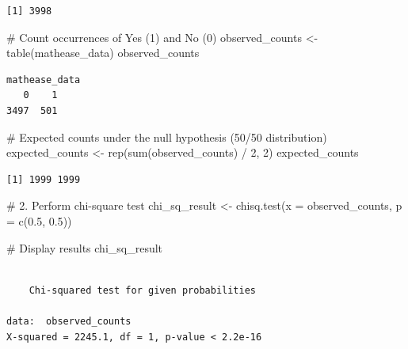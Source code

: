 \documentclass[
  letterpaper,
  DIV=11,
  numbers=noendperiod]{scrreprt}
\newenvironment{Shaded}{\begin{snugshade}}{\end{snugshade}}
\newcommand{\AttributeTok}[1]{\textcolor[rgb]{0.40,0.45,0.13}{#1}}
\newcommand{\CommentTok}[1]{\textcolor[rgb]{0.37,0.37,0.37}{#1}}
\newcommand{\DecValTok}[1]{\textcolor[rgb]{0.68,0.00,0.00}{#1}}
\newcommand{\FloatTok}[1]{\textcolor[rgb]{0.68,0.00,0.00}{#1}}
\newcommand{\FunctionTok}[1]{\textcolor[rgb]{0.28,0.35,0.67}{#1}}
\newcommand{\NormalTok}[1]{\textcolor[rgb]{0.00,0.23,0.31}{#1}}
\newcommand{\OtherTok}[1]{\textcolor[rgb]{0.00,0.23,0.31}{#1}}
\newcommand{\SpecialCharTok}[1]{\textcolor[rgb]{0.37,0.37,0.37}{#1}}
\begin{document}
\begin{verbatim}
[1] 3998
\end{verbatim}

\begin{Shaded}
\begin{Highlighting}[]
\CommentTok{\# Count occurrences of Yes (1) and No (0) }
\NormalTok{observed\_counts }\OtherTok{\textless{}{-}} \FunctionTok{table}\NormalTok{(mathease\_data) }
\NormalTok{observed\_counts }
\end{Highlighting}
\end{Shaded}

\begin{verbatim}
mathease_data
   0    1 
3497  501 
\end{verbatim}

\begin{Shaded}
\begin{Highlighting}[]
\CommentTok{\# Expected counts under the null hypothesis (50/50 distribution) }
\NormalTok{expected\_counts }\OtherTok{\textless{}{-}} \FunctionTok{rep}\NormalTok{(}\FunctionTok{sum}\NormalTok{(observed\_counts) }\SpecialCharTok{/} \DecValTok{2}\NormalTok{, }\DecValTok{2}\NormalTok{) }
\NormalTok{expected\_counts }
\end{Highlighting}
\end{Shaded}

\begin{verbatim}
[1] 1999 1999
\end{verbatim}

\begin{Shaded}
\begin{Highlighting}[]
\CommentTok{\# 2. Perform chi{-}square test }
\NormalTok{chi\_sq\_result }\OtherTok{\textless{}{-}} \FunctionTok{chisq.test}\NormalTok{(}\AttributeTok{x =}\NormalTok{ observed\_counts, }\AttributeTok{p =} \FunctionTok{c}\NormalTok{(}\FloatTok{0.5}\NormalTok{, }\FloatTok{0.5}\NormalTok{)) }
\end{Highlighting}
\end{Shaded}

\begin{Shaded}
\begin{Highlighting}[]
\CommentTok{\# Display results }
\NormalTok{chi\_sq\_result }
\end{Highlighting}
\end{Shaded}

\begin{verbatim}

    Chi-squared test for given probabilities

data:  observed_counts
X-squared = 2245.1, df = 1, p-value < 2.2e-16
\end{verbatim}
\end{document}
